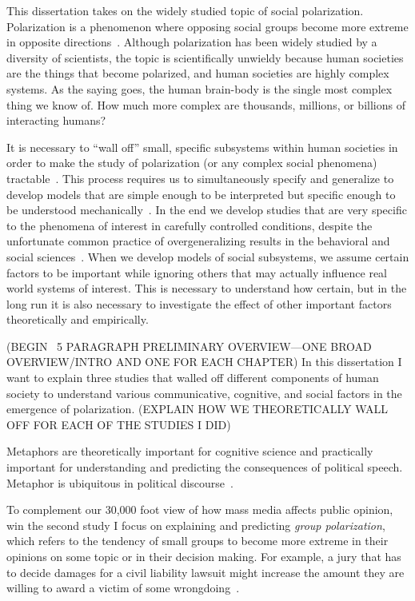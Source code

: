 \documentclass[12pt,letterpaper]{article}
\begin{document}
This dissertation takes on the widely studied topic of social polarization. 
Polarization is a phenomenon where opposing social groups become more extreme
in opposite directions~\cite{Bramson2016,Bramson2017,Jung2019,Klein2020}. 
Although polarization has been widely studied by a diversity of scientists,
the topic is scientifically unwieldy because human societies are the things
that become polarized, and human societies are highly complex systems. As the
saying goes, the human brain-body is the single most complex thing we know of.
How much more complex are thousands, millions, or billions of interacting 
humans?

It is necessary to ``wall off'' small, specific subsystems within human
societies in order to make the study of polarization (or any complex social
phenomena) tractable~\cite{Cartwright1999}.
This process requires us to simultaneously specify and generalize to develop models that
are simple enough to be interpreted but specific enough to be understood
mechanically~\cite{Craver2006,Wimsatt2007,Smaldino2017,Turner2021}. In the end
we develop studies that are very specific to the phenomena of interest
in carefully controlled conditions, despite the unfortunate common practice of
overgeneralizing results in the behavioral and social sciences~\cite{Yarkoni2021}.
When we develop models of social subsystems, we assume certain factors to be
important while ignoring others that may actually influence real world systems
of interest. This is necessary to understand how certain, but in the long run
it is also necessary to investigate the effect of other important factors
theoretically and empirically.

(BEGIN ~5 PARAGRAPH PRELIMINARY OVERVIEW---ONE BROAD OVERVIEW/INTRO AND 
ONE FOR EACH CHAPTER)
In this dissertation I want to explain three studies that walled off different
components of human society to understand various communicative, cognitive, and
social factors in the emergence of polarization. (EXPLAIN HOW WE THEORETICALLY
WALL OFF FOR EACH OF THE STUDIES I DID)

Metaphors are theoretically important for cognitive science and practically
important for understanding and predicting the consequences of political
speech. Metaphor is ubiquitous in political discourse~\cite{Burnes2011,Charteris-Black2009,Charteris-Black2005,Charteris-Black2004,Lakoff1996,Lakoff2008}.

To complement our 30,000 foot view of how mass media affects public opinion,
win the second study I focus on explaining and predicting \emph{group polarization},
which refers to the tendency of small groups to become more extreme in their
opinions on some topic or in their decision making. For example, a jury that
has to decide damages for a civil liability lawsuit might increase the amount
they are willing to award a victim of some wrongdoing~\cite{Schkade2000}.
\end{document}
